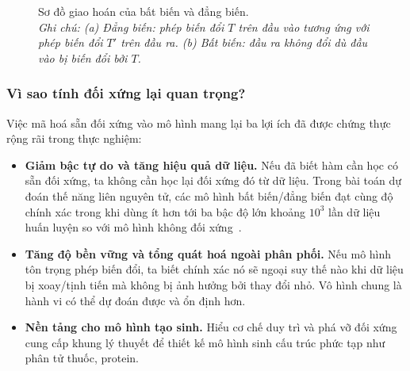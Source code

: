  
\begin{figure}[H]
\centering
{}
\caption[Sơ đồ giao hoán của bất biến và đẳng biến]{Sơ đồ giao hoán của bất biến và đẳng biến.\protect\\[2pt]
\textit{Ghi chú: (a) Đẳng biến: phép biến đổi $T$ trên đầu vào tương ứng với phép biến đổi $T'$ trên đầu ra. (b) Bất biến: đầu ra không đổi dù đầu vào bị biến đổi bởi $T$.}}
\label{fig:commute}
\end{figure}
 
\subsubsection{Vì sao tính đối xứng lại quan trọng?}
Việc mã hoá sẵn đối xứng vào mô hình mang lại ba lợi ích đã được chứng thực
rộng rãi trong thực nghiệm:
\begin{itemize}[leftmargin=1.4em, itemsep=2pt, topsep=2pt]
  \item \textbf{Giảm bậc tự do và tăng hiệu quả dữ liệu.} Nếu đã biết hàm cần
  học có sẵn đối xứng, ta không cần học lại đối xứng đó từ dữ liệu. Trong bài toán dự đoán thế năng liên nguyên tử, các mô hình bất biến/đẳng biến đạt cùng độ chính xác trong khi dùng ít hơn tới ba bậc độ lớn khoảng $10^{3}$ lần dữ liệu huấn luyện so với mô hình không đối xứng~\cite{batzner2022nequip}.
  \item \textbf{Tăng độ bền vững và tổng quát hoá ngoài phân phối.} Nếu
  mô hình tôn trọng phép biến đổi, ta biết chính xác nó sẽ ngoại suy thế nào khi dữ liệu bị xoay/tịnh tiến mà không bị ảnh hưởng bởi thay đổi nhỏ. Vô hình chung là hành vi có thể dự đoán được và ổn định hơn.
  \item \textbf{Nền tảng cho mô hình tạo sinh.} Hiểu cơ chế duy trì và phá vỡ
  đối xứng cung cấp khung lý thuyết để thiết kế mô hình sinh cấu trúc phức tạp như phân tử thuốc, protein.
\end{itemize}
 

